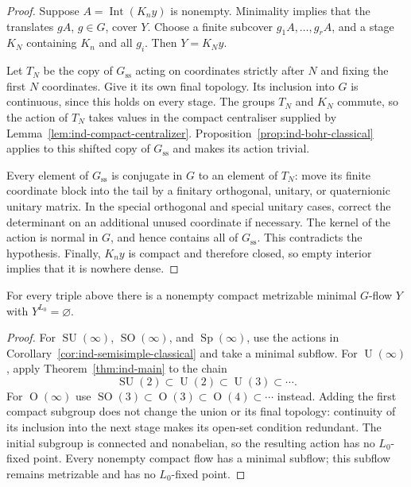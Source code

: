 \begin{proof}
Suppose $A=\operatorname{Int}(K_ny)$ is nonempty. Minimality implies
that the translates $gA$, $g\in G$, cover $Y$. Choose a finite
subcover $g_1A,\ldots,g_rA$, and a stage $K_N$ containing $K_n$ and
all $g_i$. Then $Y=K_Ny$.

Let $T_N$ be the copy of $G_{\mathrm{ss}}$ acting on coordinates strictly after $N$
and fixing the first $N$ coordinates. Give it its own final topology.
Its inclusion into $G$ is continuous, since this holds on every stage.
The groups $T_N$ and $K_N$ commute, so the action of $T_N$ takes
values in the compact centraliser supplied by
Lemma~\ref{lem:ind-compact-centralizer}. Proposition~\ref{prop:ind-bohr-classical}
applies to this shifted copy of $G_{\mathrm{ss}}$ and makes its action trivial.

Every element of $G_{\mathrm{ss}}$ is conjugate in $G$ to an element of $T_N$:
move its finite coordinate block into the tail by a finitary
orthogonal, unitary, or quaternionic unitary matrix. In the special
orthogonal and special unitary cases, correct the determinant on an
additional unused coordinate if necessary. The kernel of the action
is normal in $G$, and hence contains all of $G_{\mathrm{ss}}$. This contradicts
the hypothesis. Finally, $K_ny$ is compact and therefore closed, so
empty interior implies that it is nowhere dense.
\end{proof}

\begin{lemma}\label{lem:ind-semisimple-witness}
For every triple above there is a nonempty compact metrizable minimal
$G$-flow $Y$ with $Y^{L_0}=\varnothing$.
\end{lemma}

\begin{proof}
For $\operatorname{SU}(\infty)$, $\operatorname{SO}(\infty)$, and $\operatorname{Sp}(\infty)$, use the
actions in Corollary~\ref{cor:ind-semisimple-classical} and take a minimal
subflow. For $\operatorname{U}(\infty)$, apply Theorem~\ref{thm:ind-main} to the chain
\[
\operatorname{SU}(2)\subset\operatorname{U}(2)\subset\operatorname{U}(3)\subset\cdots.
\]
For $\operatorname{O}(\infty)$ use
$\operatorname{SO}(3)\subset\operatorname{O}(3)\subset\operatorname{O}(4)\subset\cdots$ instead.
Adding the first compact subgroup does not change the union or its
final topology: continuity of its inclusion into the next stage
makes its open-set condition redundant. The initial subgroup is
connected and nonabelian, so the resulting action has no $L_0$-fixed
point. Every nonempty compact flow has a minimal subflow; this
subflow remains metrizable and has no $L_0$-fixed point.
\end{proof}


